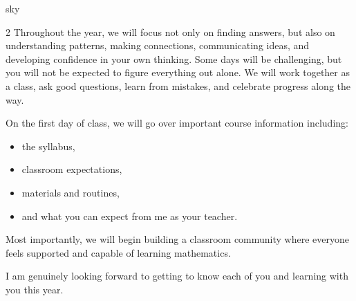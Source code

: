 \documentclass[12pt]{article}
\begin{document}
\begin{skillbox}{sky}
\begin{multicols}{2}
            Throughout the year, we will focus not only on finding answers,
            but also on understanding patterns, making connections,
            communicating ideas, and developing confidence in your own thinking.
            Some days will be challenging, but you will not be expected
            to figure everything out alone.
            We will work together as a class, ask good questions, learn from mistakes,
            and celebrate progress along the way.

            On the first day of class, we will go over important course information
            including:
            \begin{itemize}
                \item the syllabus,
                \item classroom expectations,
                \item materials and routines,
                \item and what you can expect from me as your teacher.
            \end{itemize}

            Most importantly, we will begin building a classroom community
            where everyone feels supported and capable of learning mathematics.

            I am genuinely looking forward to getting to know each of you
            and learning with you this year.

        \end{multicols}
    \end{skillbox}
\end{document}
